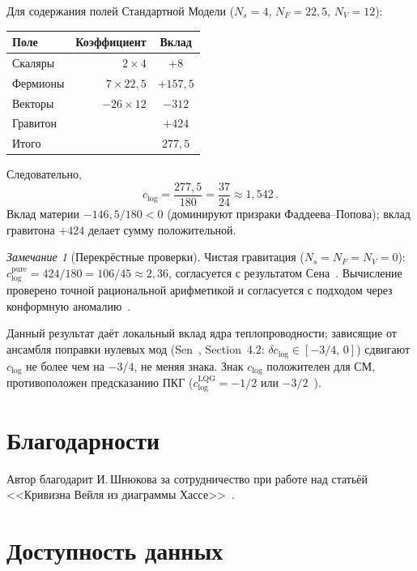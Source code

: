 \documentclass[12pt,a4paper]{article}
\theoremstyle{plain}
\theoremstyle{definition}
\theoremstyle{remark}
\newtheorem{remark}[theorem]{Замечание}
\begin{document}
Для содержания полей Стандартной Модели ($N_s = 4$,
$N_F = 22{,}5$, $N_V = 12$):
\begin{center}
\begin{tabular}{lrc}
\toprule
Поле & Коэффициент & Вклад \\
\midrule
Скаляры  & $2 \times 4$ & $+8$ \\
Фермионы & $7 \times 22{,}5$ & $+157{,}5$ \\
Векторы  & $-26 \times 12$ & $-312$ \\
Гравитон & & $+424$ \\
\midrule
Итого    & & $277{,}5$ \\
\bottomrule
\end{tabular}
\end{center}
Следовательно,
\begin{equation}\label{eq:clog-result}
  \boxed{c_{\log} = \frac{277{,}5}{180}
  = \frac{37}{24} \approx 1{,}542\,.}
\end{equation}
Вклад материи $-146{,}5/180 < 0$ (доминируют призраки
Фаддеева--Попова); вклад гравитона $+424$ делает сумму
положительной.

\begin{remark}[Перекрёстные проверки]
Чистая гравитация ($N_s = N_F = N_V = 0$):
$c_{\log}^{\mathrm{pure}} = 424/180 = 106/45 \approx 2{,}36$,
согласуется с результатом Сена~\cite{Sen:2012}.
Вычисление проверено точной рациональной арифметикой и согласуется
с подходом через конформную аномалию~\cite{BirDav:1982}.

Данный результат даёт локальный вклад ядра теплопроводности;
зависящие от ансамбля поправки нулевых мод
(Sen~\cite{Sen:2012}, Section~4.2: $\delta c_{\log} \in [-3/4,\, 0]$)
сдвигают $c_{\log}$ не более чем на $-3/4$, не меняя знака. Знак $c_{\log}$
положителен для СМ, противоположен предсказанию ПКГ
($c_{\log}^{\mathrm{LQG}} = -1/2$
или $-3/2$~\cite{Meissner:2004,KaulMajumdar:2000}).
\end{remark}

\section*{Благодарности}

Автор благодарит И.\,Шнюкова за сотрудничество при работе над
статьёй <<Кривизна Вейля из диаграммы
Хассе>>~\cite{Alfyorov:2026paper7}.

\section*{Доступность данных}
\end{document}
